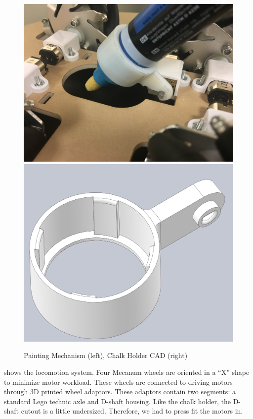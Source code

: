 \begin{figure}[h!]
\centering
\includegraphics[width=0.49\columnwidth]{CAD/painting.jpeg}
\includegraphics[width=0.49\columnwidth]{CAD/chalk_holder.jpeg}
\label{fig:em2}
\caption{Painting Mechanism (left), Chalk Holder CAD (right)}
\end{figure}

 shows the locomotion system. Four Mecanum wheels are oriented in a “X” shape to minimize motor workload. These wheels are connected to driving motors through 3D printed wheel adaptors. These adaptors contain two segments: a standard Lego technic axle and D-shaft housing. Like the chalk holder, the D-shaft cutout is a little undersized. Therefore, we had to press fit the motors in. 

